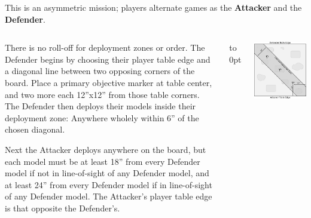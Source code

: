 

This is an asymmetric mission; players alternate games as the
\textbf{Attacker} and the \textbf{Defender}.

  \begin{columns}
\begin{tablesetup}    
  There is no roll-off for deployment zones or order.  The Defender
  begins by choosing their player table edge and a diagonal line
  between two opposing corners of the board.  Place a primary
  objective marker at table center, and two more each 12''x12'' from
  those table corners.  The Defender then deploys their models inside
  their deployment zone: Anywhere wholely within 6'' of the chosen
  diagonal.

  Next the Attacker deploys anywhere on the board, but each model must
  be at least 18'' from every Defender model if not in line-of-sight
  of any Defender model, and at least 24'' from every Defender model
  if in line-of-sight of any Defender model.  The Attacker's player
  table edge is that opposite the Defender's.
\end{tablesetup}

\bigskip
{}
\vspace{-0.5em}
\nightfighting

\vfill\vbox to 0pt{}
\columnbreak
\bigskip\centerline{\includegraphics[width=\linewidth]{maps/mission1.pdf}}
  \end{columns}
\vspace{-2.5em}

